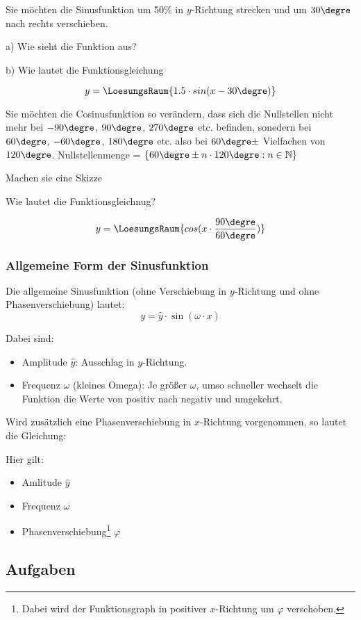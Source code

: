 Sie möchten die Sinusfunktion um 50\% in $y$-Richtung strecken und um
$30\degre$ nach rechts verschieben.

a) Wie sieht die Funktion aus?




b) Wie lautet die Funktionsgleichung

$$y = \LoesungsRaum{1.5 \cdot{} sin(x - 30\degre)}$$
\newpage

Sie möchten die Cosinusfunktion so verändern, dass sich die
Nullstellen nicht mehr bei $-90\degre$, $90\degre$, $270\degre$
etc. befinden, sonedern bei $60\degre$, $-60\degre$, $180\degre$
etc. also bei $60\degre \pm$ Vielfachen von
$120\degre$. Nullstellenmenge = $\{60\degre\pm n\cdot{}120\degre:
n\in\mathbb{N}\}$

Machen sie eine Skizze


Wie lautet die Funktionsgleichnug?

$$y = \LoesungsRaum{cos(x\cdot\frac{90\degre}{60\degre})}$$
\newpage




\subsubsection{Allgemeine Form der Sinusfunktion}

Die allgemeine Sinusfunktion (ohne Verschiebung in $y$-Richtung und
ohne Phasenverschiebung) lautet:
$$y=\hat{y}\cdot{}\sin(\omega\cdot{}x)$$

Dabei sind:
\begin{itemize}

\item
  Amplitude $\hat{y}$: Ausschlag in $y$-Richtung.
\item
  Frequenz $\omega$ (kleines Omega): Je größer $\omega$, umso schneller wechselt die
  Funktion die Werte von positiv nach negativ und umgekehrt.
\end{itemize}

Wird zusätzlich eine Phasenverschiebung in $x$-Richtung vorgenommen, so lautet die Gleichung:

\begin{center}
  \end{center}

Hier gilt:
\begin{itemize}

\item
  Amlitude $\hat{y}$
\item
  Frequenz $\omega$
\item
  Phasenverschiebung\footnote{Dabei wird der Funktionsgraph in positiver $x$-Richtung um
    $\varphi$ verschoben.} $\varphi$
\end{itemize}


\subsection*{Aufgaben}
